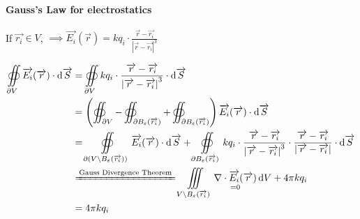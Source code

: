\paragraph*{Gauss's Law for electrostatics}

If $\overrightarrow{r_i}\in V$, $\implies\overrightarrow{E_i}(\overrightarrow{r})=kq_i\cdot\frac{\overrightarrow{r}-\overrightarrow{r_i}}{\left|\overrightarrow{r}-\overrightarrow{r_i}\right|^3}$

\begin{align*}
    \oiint\limits_{\partial V}\overrightarrow{E_i}(\overrightarrow{r})\cdot\mathrm{d}\overrightarrow{S}
     & =\oiint\limits_{\partial V}kq_i\cdot\frac{\overrightarrow{r}-\overrightarrow{r_i}}{\left|\overrightarrow{r}-\overrightarrow{r_i}\right|^3}\cdot\mathrm{d}\overrightarrow{S}                                                                                                                                                                                                                                                                                                  \\
     & =\left(\oiint_{\partial V}-\oiint_{\partial B_{\varepsilon}(\overrightarrow{r_i})}+\oiint_{\partial B_{\varepsilon}(\overrightarrow{r_i})}\right)\overrightarrow{E_i}(\overrightarrow{r})\cdot\mathrm{d}\overrightarrow{S}                                                                                                                                                                                                                                                   \\
     & =\oiint\limits_{\partial(V\setminus B_{\varepsilon}(\overrightarrow{r_i}))}\overrightarrow{E_i}(\overrightarrow{r})\cdot\mathrm{d}\overrightarrow{S}+\oiint\limits_{\partial B_{\varepsilon}(\overrightarrow{r_i})}kq_i\cdot\frac{\overrightarrow{r}-\overrightarrow{r_i}}{\left|\overrightarrow{r}-\overrightarrow{r_i}\right|^3}\cdot\frac{\overrightarrow{r}-\overrightarrow{r_i}}{\left|\overrightarrow{r}-\overrightarrow{r_i}\right|}\cdot\mathrm{d}\overrightarrow{S} \\
     & \xlongequal{\text{Gauss Divergence Theorem}}\iiint\limits_{V\setminus B_{\varepsilon}(\overrightarrow{r_i})}\underset{=0}{\nabla\cdot\overrightarrow{E_i}(\overrightarrow{r})}\,\mathrm{d}V+4\pi kq_i                                                                                                                                                                                                                                                                        \\
     & =4\pi kq_i
\end{align*}

